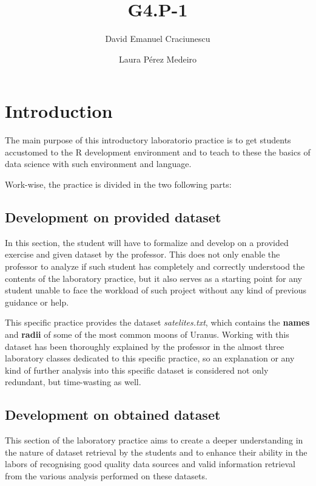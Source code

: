 \documentclass[a4paper]{article}
\title{G4.P-1}
\author{David Emanuel Craciunescu \and Laura Pérez Medeiro}
\begin{document}
\maketitle






\section*{Introduction}



The main purpose of this introductory laboratorio practice is to get students
accustomed to the R development environment and to teach to these the basics of
data science with such environment and language.

Work-wise, the practice is divided in the two following parts:


\subsection*{Development on provided dataset}
In this section, the student will have to formalize and develop on a provided
exercise and given dataset by the professor. This does not only enable the
professor to analyze if such student has completely and correctly understood the
contents of the laboratory practice, but it also serves as a starting point for
any student unable to face the workload of such project without any kind of
previous guidance or help.

This specific practice provides the dataset \textit{satelites.txt}, which
contains the \textbf{names} and \textbf{radii} of some of the most common moons
of Uranus. Working with this dataset has been thoroughly explained by the
professor in the almost three laboratory classes dedicated to this specific
practice, so an explanation or any kind of further analysis into this specific
dataset is considered not only redundant, but time-wasting as well.


\subsection*{Development on obtained dataset}

This section of the laboratory practice aims to create a deeper understanding in
the nature of dataset retrieval by the students and to enhance their ability in
the labors of recognising good quality data sources and valid information
retrieval from the various analysis performed on these datasets.
\end{document}
